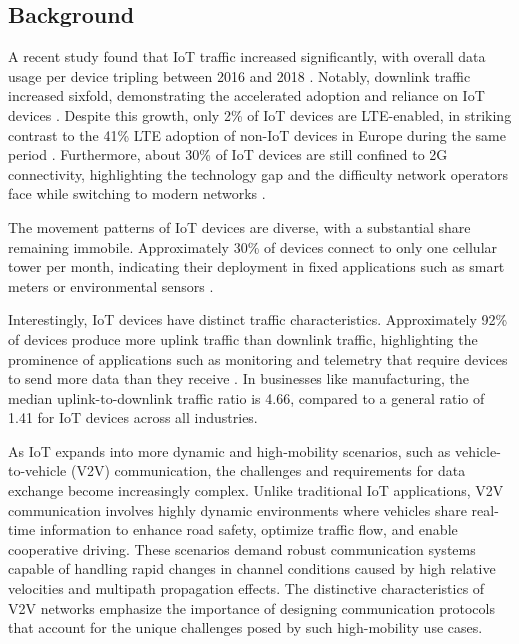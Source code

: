 \subsection{Background}

A recent study found that IoT traffic increased significantly, with overall data usage per device tripling between 2016 and 2018 \cite{Shafiq2013, Andrade2017}. Notably, downlink traffic increased sixfold, demonstrating the accelerated adoption and reliance on IoT devices \cite{Shafiq2013, Andrade2017}. Despite this growth, only 2\% of IoT devices are LTE-enabled, in striking contrast to the 41\% LTE adoption of non-IoT devices in Europe during the same period \cite{GSM2018}. Furthermore, about 30\% of IoT devices are still confined to 2G connectivity, highlighting the technology gap and the difficulty network operators face while switching to modern networks \cite{GSM2018}.

The movement patterns of IoT devices are diverse, with a substantial share remaining immobile. Approximately 30\% of devices connect to only one cellular tower per month, indicating their deployment in fixed applications such as smart meters or environmental sensors \cite{Shafiq2013}.

Interestingly, IoT devices have distinct traffic characteristics. Approximately 92\% of devices produce more uplink traffic than downlink traffic, highlighting the prominence of applications such as monitoring and telemetry that require devices to send more data than they receive \cite{Shafiq2013}. In businesses like manufacturing, the median uplink-to-downlink traffic ratio is 4.66, compared to a general ratio of 1.41 for IoT devices across all industries.

As IoT expands into more dynamic and high-mobility scenarios, such as vehicle-to-vehicle (V2V) communication, the challenges and requirements for data exchange become increasingly complex. Unlike traditional IoT applications, V2V communication involves highly dynamic environments where vehicles share real-time information to enhance road safety, optimize traffic flow, and enable cooperative driving. These scenarios demand robust communication systems capable of handling rapid changes in channel conditions caused by high relative velocities and multipath propagation effects. The distinctive characteristics of V2V networks emphasize the importance of designing communication protocols that account for the unique challenges posed by such high-mobility use cases.


